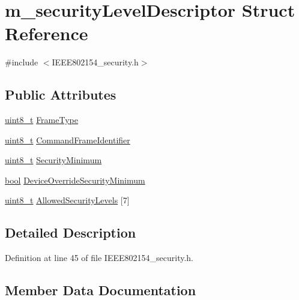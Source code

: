 \hypertarget{structm__security_level_descriptor}{}\section{m\+\_\+security\+Level\+Descriptor Struct Reference}
\label{structm__security_level_descriptor}


{\ttfamily \#include $<$I\+E\+E\+E802154\+\_\+security.\+h$>$}

\subsection*{Public Attributes}
\begin{DoxyCompactItemize}
\item 
\hyperlink{_p_e___types_8h_aba7bc1797add20fe3efdf37ced1182c5}{uint8\+\_\+t} \hyperlink{structm__security_level_descriptor_ad1be943ffda119a9606f1c2dbf93af39}{Frame\+Type}
\item 
\hyperlink{_p_e___types_8h_aba7bc1797add20fe3efdf37ced1182c5}{uint8\+\_\+t} \hyperlink{structm__security_level_descriptor_a551a434a411befedb20f1de326680903}{Command\+Frame\+Identifier}
\item 
\hyperlink{_p_e___types_8h_aba7bc1797add20fe3efdf37ced1182c5}{uint8\+\_\+t} \hyperlink{structm__security_level_descriptor_a585de696912f72295532cefb716e239f}{Security\+Minimum}
\item 
\hyperlink{_p_e___types_8h_a97a80ca1602ebf2303258971a2c938e2}{bool} \hyperlink{structm__security_level_descriptor_aa48ee7b3f8fdecd586eb0edf50be7c03}{Device\+Override\+Security\+Minimum}
\item 
\hyperlink{_p_e___types_8h_aba7bc1797add20fe3efdf37ced1182c5}{uint8\+\_\+t} \hyperlink{structm__security_level_descriptor_a099bd48a7add8492359719d9c828afa7}{Allowed\+Security\+Levels} \mbox{[}7\mbox{]}
\end{DoxyCompactItemize}


\subsection{Detailed Description}


Definition at line 45 of file I\+E\+E\+E802154\+\_\+security.\+h.



\subsection{Member Data Documentation}
